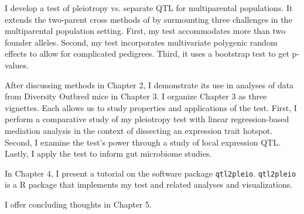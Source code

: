 \newenvironment{abstract}%
    {\cleardoublepage\null\vfill\begin{center}%
    \bfseries\abstractname\end{center}}%
    {\vfill\null}
        \begin{abstract}
I develop a test of pleiotropy vs. separate QTL for multiparental populations.
It extends the two-parent cross methods of \citet{jiang1995multiple} by
surmounting three challenges in the multiparental population setting. 
First, my test accommodates more than two founder alleles.
Second, my test incorporates multivariate polygenic random effects to allow
for complicated pedigrees. 
Third, it uses a bootstrap test to get p-values. 

After discussing methods in Chapter 2, I demonstrate its use in analyses of
data from Diversity Outbred mice in Chapter 3. 
I organize Chapter 3 as three vignettes. 
Each allows us to study properties and applications of the test.
First, I perform a comparative study of my pleiotropy test with 
linear regression-based mediation analysis in the context of dissecting
an expression trait hotspot.
Second, I examine the test's power through a study of local expression QTL. 
Lastly, I apply the test to inform gut microbiome studies.

In Chapter 4, I present a tutorial on the software package \texttt{qtl2pleio}. 
\texttt{qtl2pleio} is a R package that implements my test and related
analyses and visualizations. 

I offer concluding thoughts in Chapter 5. 
\end{abstract}
